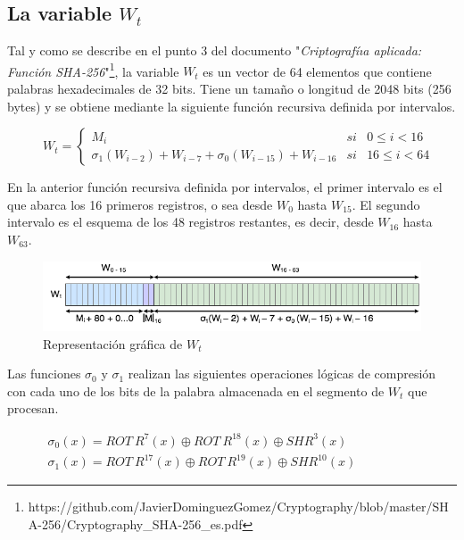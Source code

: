 \documentclass{article}
\begin{document}
    \subsection{La variable $W_t$}
        Tal y como se describe en el punto 3 del documento "\textit{Criptografíıa aplicada: Función SHA-256}"\footnote{https://github.com/JavierDominguezGomez/Cryptography/blob/master/SHA-256/Cryptography\_SHA-256\_es.pdf}, la variable $W_{t}$ es un vector de 64 elementos que contiene palabras hexadecimales de 32 bits. Tiene un tamaño o longitud de 2048 bits (256 bytes) y se obtiene mediante la siguiente función recursiva definida por intervalos.
            \begin{figure}[H]
            \centering
                $W_{t} = \left \{
                \begin{array}{lcl}
                    M_{i} & si & 0 \le i < 16 \\
                    \sigma_{1}(W_{i-2})+W_{i-7}+\sigma_{0}(W_{i-15})+W_{i-16} & si & 16 \le i < 64
                \end{array}
                \right .$
            \end{figure}
        En la anterior función recursiva definida por intervalos, el primer intervalo es el que abarca los 16 primeros registros, o sea desde $W_{0}$ hasta $W_{15}$. El segundo intervalo es el esquema de los 48 registros restantes, es decir, desde $W_{16}$ hasta $W_{63}$.
            \begin{figure}[H]
            \centering
                \includegraphics[scale=0.5]{img/SHA-256-Wt.png}
                \caption{Representación gráfica de $W_{t}$}
            \end{figure}
        Las funciones  $\sigma_{0}$ y $\sigma_{1}$ realizan las siguientes operaciones lógicas de compresión con cada uno de los bits de la palabra almacenada en el segmento de $W_t$ que procesan.
        \begin{figure}[H]
        \centering
            $\begin{array}{l}
                \sigma_{0}(x) = ROT \ R^{7}(x) \oplus ROT \ R^{18}(x) \oplus SHR^{3}(x) \\
                \sigma_{1}(x) = ROT \ R^{17}(x) \oplus ROT \ R^{19}(x) \oplus SHR^{10}(x)
            \end{array}$
        \end{figure}
        
\end{document}
